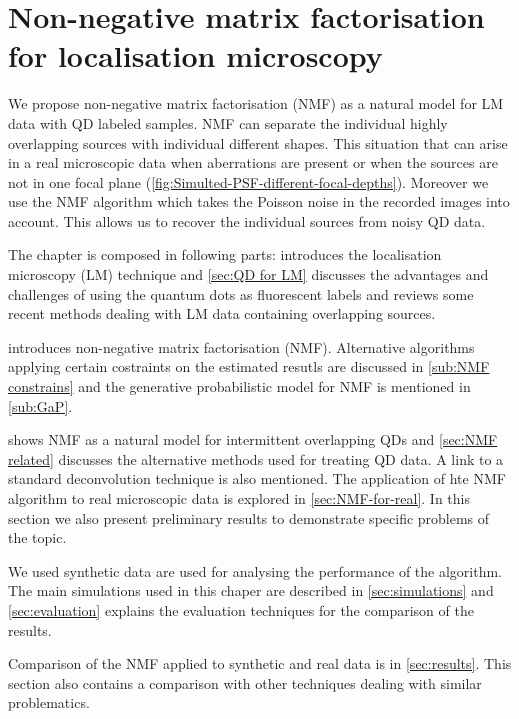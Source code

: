 \chapter{Non-negative matrix factorisation for localisation microscopy}
We propose non-negative matrix factorisation (NMF) as a natural model for LM data with QD labeled samples. NMF can separate the individual highly overlapping sources with individual different shapes. This situation that can arise in a real microscopic data when aberrations are present or when the sources are not in one focal plane (\autoref{fig:Simulted-PSF-different-focal-depths}). Moreover we use the NMF algorithm which takes the Poisson noise in the recorded images into account. This allows us to recover the individual sources from noisy QD data.

The chapter is composed in following parts:  introduces the localisation microscopy (LM) technique and \autoref{sec:QD for LM} discusses the advantages and challenges of using the quantum dots as fluorescent labels and reviews some recent methods dealing with LM data containing overlapping sources. 

 introduces non-negative matrix factorisation (NMF). Alternative algorithms applying certain costraints on the estimated resutls are discussed in \autoref{sub:NMF constrains} and the generative probabilistic model for NMF is mentioned in \autoref{sub:GaP}.

 shows NMF as a natural model for intermittent overlapping QDs and \autoref{sec:NMF related} discusses the alternative methods used for treating QD data. A link to a standard deconvolution technique is also mentioned. The application of hte NMF algorithm to real microscopic data is explored in \autoref{sec:NMF-for-real}. In this section we also present preliminary results to demonstrate specific problems of the topic.

We used synthetic data are used for analysing the performance of the algorithm. The main simulations used in this chaper are described in \autoref{sec:simulations} and \autoref{sec:evaluation} explains the evaluation techniques for the comparison of the results.

Comparison of the NMF applied to synthetic and real data is in \autoref{sec:results}. This section also contains a comparison with other techniques dealing with similar problematics. 


